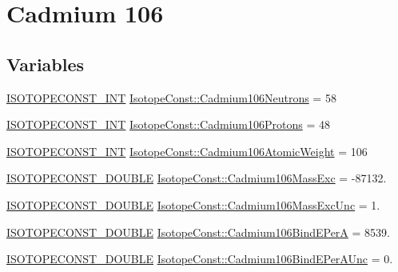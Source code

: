 \hypertarget{group___isotope_const-_cadmium-_cd106}{}\section{Cadmium 106}
\label{group___isotope_const-_cadmium-_cd106}
\subsection*{Variables}
\begin{DoxyCompactItemize}
\item 
\mbox{\hyperlink{group___isotope_const-_macros_ga5f18360b3e99483a35c32d789e62621c}{I\+S\+O\+T\+O\+P\+E\+C\+O\+N\+S\+T\+\_\+\+I\+NT}} \mbox{\hyperlink{group___isotope_const-_cadmium-_cd106_ga14c1b85f5c025a066803f56703e97f45}{Isotope\+Const\+::\+Cadmium106\+Neutrons}} = 58
\item 
\mbox{\hyperlink{group___isotope_const-_macros_ga5f18360b3e99483a35c32d789e62621c}{I\+S\+O\+T\+O\+P\+E\+C\+O\+N\+S\+T\+\_\+\+I\+NT}} \mbox{\hyperlink{group___isotope_const-_cadmium-_cd106_gacccfb22657e92de20964d5930750e000}{Isotope\+Const\+::\+Cadmium106\+Protons}} = 48
\item 
\mbox{\hyperlink{group___isotope_const-_macros_ga5f18360b3e99483a35c32d789e62621c}{I\+S\+O\+T\+O\+P\+E\+C\+O\+N\+S\+T\+\_\+\+I\+NT}} \mbox{\hyperlink{group___isotope_const-_cadmium-_cd106_ga3163a90507bc4339217e369df6b29499}{Isotope\+Const\+::\+Cadmium106\+Atomic\+Weight}} = 106
\item 
\mbox{\hyperlink{group___isotope_const-_macros_ga8f45a7272ce02c0b4c65c44636ed719a}{I\+S\+O\+T\+O\+P\+E\+C\+O\+N\+S\+T\+\_\+\+D\+O\+U\+B\+LE}} \mbox{\hyperlink{group___isotope_const-_cadmium-_cd106_ga6b23f2e6a3a927332891df41776713bb}{Isotope\+Const\+::\+Cadmium106\+Mass\+Exc}} = -\/87132.
\item 
\mbox{\hyperlink{group___isotope_const-_macros_ga8f45a7272ce02c0b4c65c44636ed719a}{I\+S\+O\+T\+O\+P\+E\+C\+O\+N\+S\+T\+\_\+\+D\+O\+U\+B\+LE}} \mbox{\hyperlink{group___isotope_const-_cadmium-_cd106_ga36d6f0f5d70f97068ba72bd429fad716}{Isotope\+Const\+::\+Cadmium106\+Mass\+Exc\+Unc}} = 1.
\item 
\mbox{\hyperlink{group___isotope_const-_macros_ga8f45a7272ce02c0b4c65c44636ed719a}{I\+S\+O\+T\+O\+P\+E\+C\+O\+N\+S\+T\+\_\+\+D\+O\+U\+B\+LE}} \mbox{\hyperlink{group___isotope_const-_cadmium-_cd106_ga3138e105d4e70b34bb434767773b7da6}{Isotope\+Const\+::\+Cadmium106\+Bind\+E\+PerA}} = 8539.
\item 
\mbox{\hyperlink{group___isotope_const-_macros_ga8f45a7272ce02c0b4c65c44636ed719a}{I\+S\+O\+T\+O\+P\+E\+C\+O\+N\+S\+T\+\_\+\+D\+O\+U\+B\+LE}} \mbox{\hyperlink{group___isotope_const-_cadmium-_cd106_ga0f16f7d84efa42b6f0683ddcc3f93ee0}{Isotope\+Const\+::\+Cadmium106\+Bind\+E\+Per\+A\+Unc}} = 0.

\end{DoxyCompactItemize}
